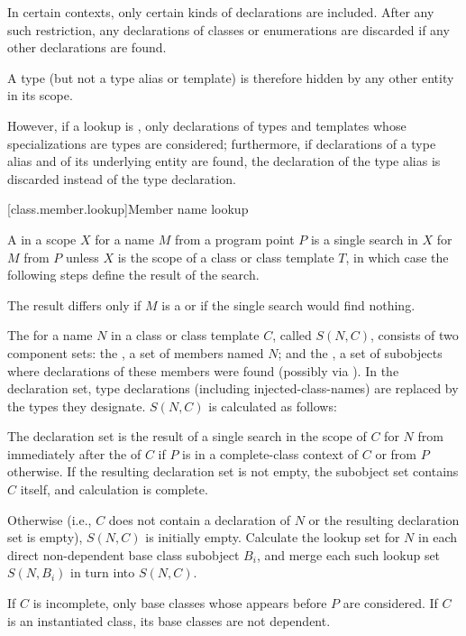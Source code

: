 \pnum
In certain contexts, only certain kinds of declarations are included.
After any such restriction, any declarations of classes or enumerations are discarded if any other declarations are found.
\begin{note}
A type (but not a type alias or template)
is therefore hidden by any other entity in its scope.
\end{note}
%
However, if a lookup is ,
only declarations of
types and templates whose specializations are types are considered;
furthermore, if declarations
of a type alias and of its underlying entity are found,
the declaration of the type alias is discarded
instead of the type declaration.

[class.member.lookup]{Member name lookup}%
%
%

\pnum
{}%
A  in a scope $X$ for a name $M$ from a program point $P$
is a single search in $X$ for $M$ from $P$
unless $X$ is the scope of a class or class template $T$, in which case the
following steps define the result of the search.
\begin{note}
The result differs only
if $M$ is a  or
if the single search would find nothing.
\end{note}

\pnum
The  for a name $N$ in a class or class template $C$, called $S(N,C)$,
consists of two component sets:
the , a set of members named $N$; and
the ,
a set of subobjects where declarations of these members were found
(possibly via ).
In the declaration set, type declarations (including injected-class-names)
are replaced by the types they designate. $S(N,C)$ is calculated as follows:

\pnum
The declaration set is the result of
a single search in the scope of $C$ for $N$
from immediately after the  of $C$
if $P$ is in a complete-class context of $C$ or
from $P$ otherwise.
If the resulting declaration set is not empty, the subobject set
contains $C$ itself, and calculation is complete.

\pnum
Otherwise (i.e., $C$ does not contain a declaration of $N$
or the resulting declaration set is empty), $S(N,C)$ is initially empty.
Calculate the lookup set for $N$
in each direct non-dependent base class subobject $B_i$, and
merge each such lookup set $S(N,B_i)$ in turn into $S(N,C)$.
\begin{note}
If $C$ is incomplete,
only base classes whose  appears before $P$
are considered.
If $C$ is an instantiated class, its base classes are not dependent.
\end{note}


